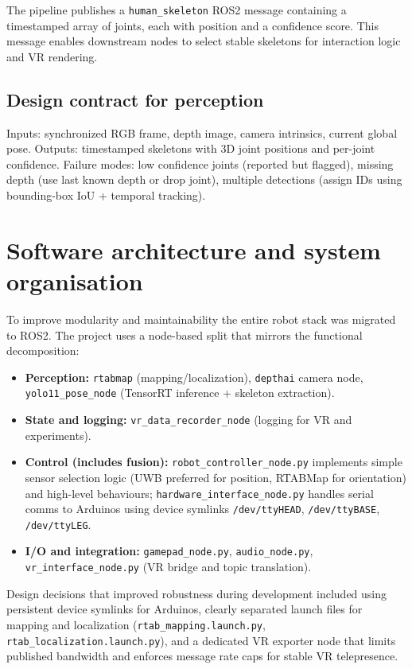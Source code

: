 The pipeline publishes a \texttt{human\_skeleton} ROS2 message containing a timestamped array of joints, each with position and a confidence score. This message enables downstream nodes to select stable skeletons for interaction logic and VR rendering.

\subsection*{Design contract for perception}
Inputs: synchronized RGB frame, depth image, camera intrinsics, current global pose.
Outputs: timestamped skeletons with 3D joint positions and per-joint confidence.
Failure modes: low confidence joints (reported but flagged), missing depth (use last known depth or drop joint), multiple detections (assign IDs using bounding-box IoU + temporal tracking).

\section{Software architecture and system organisation}

To improve modularity and maintainability the entire robot stack was migrated to ROS2. The project uses a node-based split that mirrors the functional decomposition:

\begin{itemize}
	\item \textbf{Perception:} \texttt{rtabmap} (mapping/localization), \texttt{depthai} camera node, \texttt{yolo11\_pose\_node} (TensorRT inference + skeleton extraction).
	\item \textbf{State and logging:} \texttt{vr\_data\_recorder\_node} (logging for VR and experiments).
	\item \textbf{Control (includes fusion):} \texttt{robot\_controller\_node.py} implements simple sensor selection logic (UWB preferred for position, RTABMap for orientation) and high-level behaviours; \texttt{hardware\_interface\_node.py} handles serial comms to Arduinos using device symlinks \texttt{/dev/ttyHEAD}, \texttt{/dev/ttyBASE}, \texttt{/dev/ttyLEG}.
	\item \textbf{I/O and integration:} \texttt{gamepad\_node.py}, \texttt{audio\_node.py}, \texttt{vr\_interface\_node.py} (VR bridge and topic translation).
\end{itemize}

Design decisions that improved robustness during development included using persistent device symlinks for Arduinos, clearly separated launch files for mapping and localization (\texttt{rtab\_mapping.launch.py}, \texttt{rtab\_localization.launch.py}), and a dedicated VR exporter node that limits published bandwidth and enforces message rate caps for stable VR telepresence.

